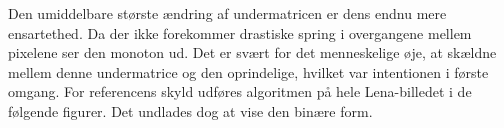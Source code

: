 Den umiddelbare største ændring af undermatricen er dens endnu mere ensartethed. Da der ikke forekommer drastiske spring i overgangene mellem pixelene ser den monoton ud. Det er svært for det menneskelige øje, at skældne mellem denne undermatrice og den oprindelige, hvilket var intentionen i første omgang. 
For referencens skyld udføres algoritmen på hele Lena-billedet i de følgende figurer. Det undlades dog at vise den binære form.

